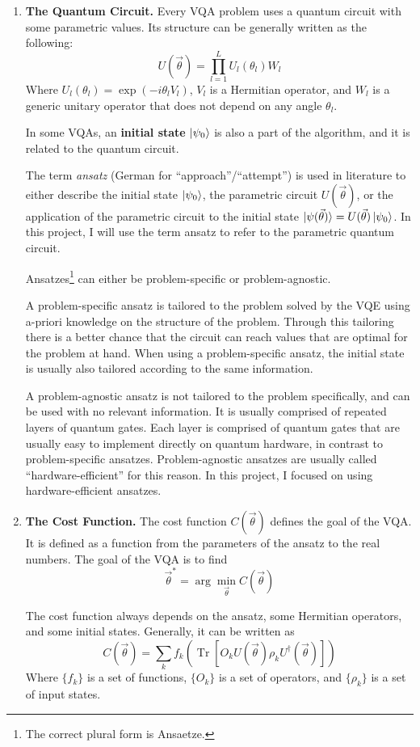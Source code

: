 \documentclass[a4paper,12pt]{article}
\newcommand{\thetas}{\vec{\theta}}
\DeclareMathOperator{\tr}{Tr}
\begin{document}
\begin{enumerate}
    \item \textbf{The Quantum Circuit.} Every VQA problem uses a quantum circuit with some parametric values.
    Its structure can be generally written as the following:
    $$ U(\thetas) = \prod_{l=1}^{L} U_l(\theta_l) W_l$$
    Where $U_l(\theta_l) = \exp(-i\theta_l V_l)$, $V_l$ is a Hermitian operator, and $W_l$ is a generic unitary operator that does not depend on any angle $\theta_l$.
    
    In some VQAs, an \textbf{initial state} $\ket{\psi_0}$ is also a part of the algorithm, and it is related to the quantum circuit.

    The term \emph{ansatz} (German for ``approach''/``attempt'') is used in literature to either describe the initial state $\ket{\psi_0}$, the parametric circuit $U(\thetas)$, or the application of the parametric circuit to the initial state $\ket{\psi(\thetas)} = U(\thetas)\ket{\psi_0}$.
    In this project, I will use the term ansatz to refer to the parametric quantum circuit.

    Ansatzes\footnote{The correct plural form is Ansaetze.} can either be problem-specific or problem-agnostic.

    A problem-specific ansatz is tailored to the problem solved by the VQE using a-priori knowledge on the structure of the problem. Through this tailoring there is a better chance that the circuit can reach values that are optimal for the problem at hand. When using a problem-specific ansatz, the initial state is usually also tailored according to the same information.
    
    A problem-agnostic ansatz is not tailored to the problem specifically, and can be used with no relevant information. It is usually comprised of repeated layers of quantum gates. Each layer is comprised of quantum gates that are usually easy to implement directly on quantum hardware, in contrast to problem-specific ansatzes. Problem-agnostic ansatzes are usually called ``hardware-efficient'' for this reason.
    In this project, I focused on using hardware-efficient ansatzes.
    
    \item \textbf{The Cost Function.} The cost function $C(\thetas)$ defines the goal of the VQA. It is defined as a function from the parameters of the ansatz to the real numbers.
    The goal of the VQA is to find
    $$\thetas^* = \arg\min_{\thetas} C(\thetas) $$ 

    The cost function always depends on the ansatz, some Hermitian operators, and some initial states.
    Generally, it can be written as
    $$ C(\thetas) = \sum_k f_k(\tr[O_k U(\thetas) \rho_k U^\dagger(\thetas)])$$
    Where $\{f_k\}$ is a set of functions, $\{O_k\}$ is a set of operators, and $\{\rho_k\}$ is a set of input states.
    

\end{enumerate}
\end{document}
